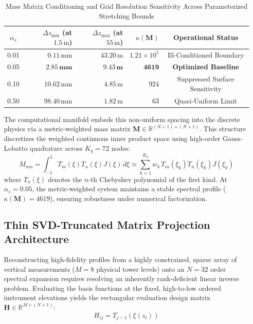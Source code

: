 \documentclass[11pt,a4paper]{article}
\begin{document}
\begin{table}[h]
\centering
\caption{Mass Matrix Conditioning and Grid Resolution Sensitivity Across Parameterized Stretching Bounds}
\label{tab:stretch_sensitivity}
\begin{tabular}{c|rrrc}
\hline
$\alpha_s$ & $\Delta z_{\min}$ (at $1.5\,\text{m}$) & $\Delta z_{\max}$ (at $55\,\text{m}$) & $\kappa(\mathbf{M})$ & Operational Status \\
\hline
0.01 & $0.11\,\text{mm}$ & $43.20\,\text{m}$ & $1.21 \times 10^5$ & Ill-Conditioned Boundary \\
0.05 & $\mathbf{2.85\,\text{mm}}$ & $\mathbf{9.43\,\text{m}}$ & $\mathbf{4619}$ & \textbf{Optimized Baseline} \\
0.10 & $10.62\,\text{mm}$ & $4.85\,\text{m}$ & $924$ & Suppressed Surface Sensitivity \\
0.50 & $98.40\,\text{mm}$ & $1.82\,\text{m}$ & $63$ & Quasi-Uniform Limit \\
\hline
\end{tabular}
\end{table}

The computational manifold embeds this non-uniform spacing into the discrete physics via a metric-weighted mass matrix $\mathbf{M} \in \mathbb{R}^{(N+1) \times (N+1)}$. This structure discretizes the weighted continuous inner product space using high-order Gauss--Lobatto quadrature across $K_q = 72$ nodes:
\begin{equation}
M_{mn} = \int_{-1}^{1} T_m(\xi) T_n(\xi) J(\xi) \, d\xi \approx \sum_{k=1}^{K_q} w_k \, T_m(\xi_k) T_n(\xi_k) J(\xi_k)
\label{eq:mass_matrix_quad}
\end{equation}
where $T_n(\xi)$ denotes the $n$-th Chebyshev polynomial of the first kind. At $\alpha_s = 0.05$, the metric-weighted system maintains a stable spectral profile ($\kappa(\mathbf{M}) = 4619$), ensuring robustness under numerical factorization.

\subsection{Thin SVD-Truncated Matrix Projection Architecture}
\label{sec:methods:svd}

Reconstructing high-fidelity profiles from a highly constrained, sparse array of vertical measurements ($M = 8$ physical tower levels) onto an $N=32$ order spectral expansion requires resolving an inherently rank-deficient linear inverse problem. Evaluating the basis functions at the fixed, high-to-low ordered instrument elevations yields the rectangular evaluation design matrix $\mathbf{H} \in \mathbb{R}^{M \times (N+1)}$:
\begin{equation}
H_{ij} = T_{j-1}(\xi(z_i))
\label{eq:h_matrix_def}
\end{equation}
\end{document}
